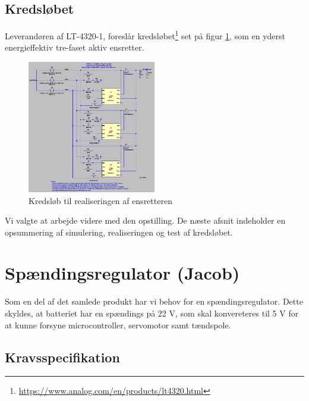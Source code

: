 \subsection{Kredsløbet}
\label{sec:kredslobet}

Leverandøren af LT-4320-1, foreslår kredsløbet\footnote{\url{https://www.analog.com/en/products/lt4320.html}} set på figur \ref{fig:prens2}, som en yderst energieffektiv tre-faset aktiv ensretter.

\begin{figure}[h]
  \centering
  \includegraphics[width=0.5\textwidth]{./figurer/prens4.png}
  \caption{Kredsløb til realiseringen af ensretteren}
  \label{fig:prens2}
\end{figure}

Vi valgte at arbejde videre med den opstilling. De næste afsnit indeholder en opsummering af simulering, realiseringen og test af kredsløbet.

\section{Spændingsregulator (Jacob)}
\label{sec:spandingsforstarker}

Som en del af det samlede produkt har vi behov for en spændingsregulator. Dette skyldes, at batteriet har en spændings på 22 V, som skal konvereteres til 5 V for at kunne forsyne microcontroller, servomotor samt tændspole. %

\subsection{Kravsspecifikation}
\label{sec:kravsspecifikation-2}

